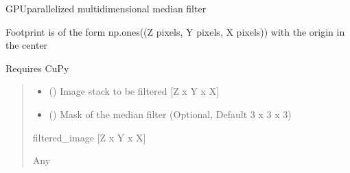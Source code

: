 \documentclass[letterpaper,10pt,english]{sphinxmanual}
\begin{document}

\begin{fulllineitems}
\label{\detokenize{ImageProcessing:ImageProcessing.fast_filter_images}}
\pysigstartsignatures
{}
\pysigstopsignatures
\sphinxAtStartPar
GPU\sphinxhyphen{}parallelized multidimensional median filter

\sphinxAtStartPar
Footprint is of the form np.ones((Z pixels, Y pixels, X pixels)) with the origin in the center

\sphinxAtStartPar
Requires CuPy
\begin{quote}\begin{description}
\begin{itemize}
\item {} 
\sphinxAtStartPar
{} () \textendash{} Image stack to be filtered {[}Z x Y x X{]}

\item {} 
\sphinxAtStartPar
{} () \textendash{} Mask of the median filter (Optional, Default 3 x 3 x 3)

\end{itemize}

\sphinxAtStartPar
filtered\_image {[}Z x Y x X{]}

\sphinxAtStartPar
Any

\end{description}\end{quote}

\end{fulllineitems}

\end{document}
